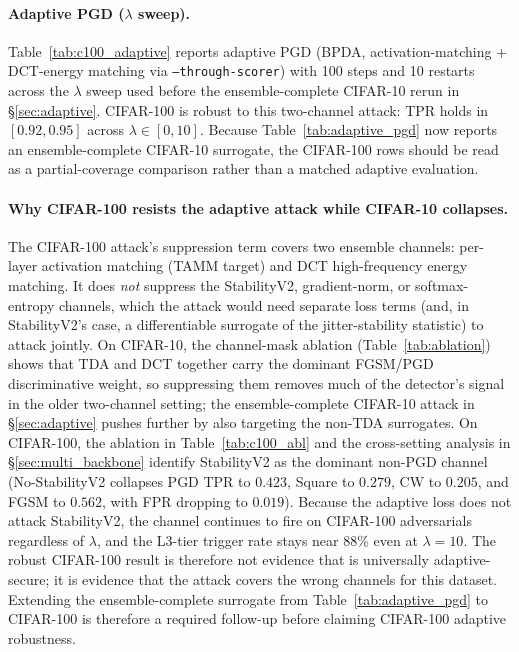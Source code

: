 \paragraph{Adaptive PGD ($\lambda$ sweep).}
Table~\ref{tab:c100_adaptive} reports adaptive PGD (BPDA,
activation-matching + DCT-energy matching via
\texttt{--through-scorer}) with 100 steps and 10 restarts across the
$\lambda$ sweep used before the ensemble-complete CIFAR-10 rerun in
\S\ref{sec:adaptive}. CIFAR-100 \prism is robust to this two-channel
attack: TPR holds in $[0.92, 0.95]$ across $\lambda \in [0, 10]$.
Because Table~\ref{tab:adaptive_pgd} now reports an ensemble-complete
CIFAR-10 surrogate, the CIFAR-100 rows should be read as a
partial-coverage comparison rather than a matched adaptive evaluation.

\paragraph{Why CIFAR-100 resists the adaptive attack while CIFAR-10
collapses.}
The CIFAR-100 attack's suppression term covers two ensemble channels: per-layer
activation matching (TAMM target) and DCT high-frequency energy
matching. It does \emph{not} suppress the StabilityV2, gradient-norm,
or softmax-entropy channels, which the attack would need separate
loss terms (and, in StabilityV2's case, a differentiable surrogate of
the jitter-stability statistic) to attack jointly. On CIFAR-10, the
channel-mask ablation (Table~\ref{tab:ablation}) shows that TDA and
DCT together carry the dominant FGSM/PGD discriminative weight, so
suppressing them removes much of the detector's signal in the older
two-channel setting; the ensemble-complete CIFAR-10 attack in
\S\ref{sec:adaptive} pushes further by also targeting the non-TDA
surrogates.
On CIFAR-100, the ablation in Table~\ref{tab:c100_abl} and the
cross-setting analysis in \S\ref{sec:multi_backbone} identify
StabilityV2 as the dominant non-PGD channel (No-StabilityV2 collapses
PGD TPR to $0.423$, Square to $0.279$, CW to $0.205$, and FGSM to
$0.562$, with FPR dropping to $0.019$). Because the adaptive loss
does not attack StabilityV2, the channel continues to fire on
CIFAR-100 adversarials regardless of $\lambda$, and the L3-tier
trigger rate stays near $88\%$ even at $\lambda{=}10$. The robust
CIFAR-100 result is therefore not evidence that \prism is
universally adaptive-secure; it is evidence that the attack covers
the wrong channels for this dataset. Extending the ensemble-complete
surrogate from Table~\ref{tab:adaptive_pgd} to CIFAR-100 is therefore a
required follow-up before claiming CIFAR-100 adaptive robustness.

